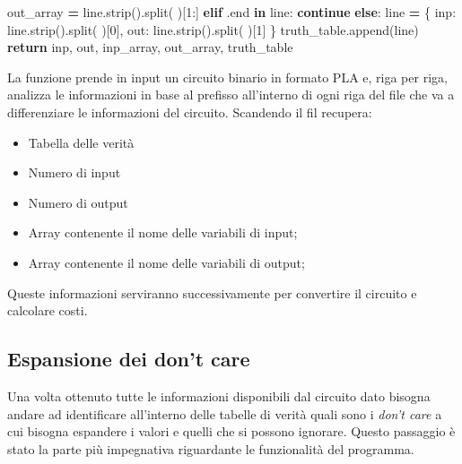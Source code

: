 \documentclass[
  italian,
]{book}
\newenvironment{Shaded}{\begin{snugshade}}{\end{snugshade}}
\newcommand{\ControlFlowTok}[1]{\textcolor[rgb]{0.13,0.29,0.53}{\textbf{#1}}}
\newcommand{\DecValTok}[1]{\textcolor[rgb]{0.00,0.00,0.81}{#1}}
\newcommand{\KeywordTok}[1]{\textcolor[rgb]{0.13,0.29,0.53}{\textbf{#1}}}
\newcommand{\NormalTok}[1]{#1}
\newcommand{\OperatorTok}[1]{\textcolor[rgb]{0.81,0.36,0.00}{\textbf{#1}}}
\newcommand{\StringTok}[1]{\textcolor[rgb]{0.31,0.60,0.02}{#1}}
\providecommand{\tightlist}{%
  \setlength{\itemsep}{0pt}\setlength{\parskip}{0pt}}
\begin{document}
\begin{Shaded}
\begin{Highlighting}[]
\NormalTok{                out\_array }\OperatorTok{=}\NormalTok{ line.strip().split(}\StringTok{\textquotesingle{} \textquotesingle{}}\NormalTok{)[}\DecValTok{1}\NormalTok{:]}
            \ControlFlowTok{elif} \StringTok{\textquotesingle{}.end\textquotesingle{}} \KeywordTok{in}\NormalTok{ line:}
                \ControlFlowTok{continue}
            \ControlFlowTok{else}\NormalTok{:}
\NormalTok{                line }\OperatorTok{=}\NormalTok{ \{}
                    \StringTok{\textquotesingle{}inp\textquotesingle{}}\NormalTok{:  line.strip().split(}\StringTok{\textquotesingle{} \textquotesingle{}}\NormalTok{)[}\DecValTok{0}\NormalTok{],}
                    \StringTok{\textquotesingle{}out\textquotesingle{}}\NormalTok{:  line.strip().split(}\StringTok{\textquotesingle{} \textquotesingle{}}\NormalTok{)[}\DecValTok{1}\NormalTok{]}
\NormalTok{                \}}
\NormalTok{                truth\_table.append(line)}
    \ControlFlowTok{return}\NormalTok{ inp, out, inp\_array, out\_array, truth\_table}
\end{Highlighting}
\end{Shaded}

La funzione prende in input un circuito binario in formato PLA e, riga per riga, analizza le informazioni in base al prefisso all'interno di ogni riga del file che va a differenziare le informazioni del circuito. Scandendo il fil recupera:

\begin{itemize}
\tightlist
\item
  Tabella delle verità
\item
  Numero di input
\item
  Numero di output
\item
  Array contenente il nome delle variabili di input;
\item
  Array contenente il nome delle variabili di output;
\end{itemize}

Queste informazioni serviranno successivamente per convertire il circuito e calcolare costi.

\hypertarget{espansione-dei-dont-care}{%
\subsection{Espansione dei don't care}\label{espansione-dei-dont-care}}

Una volta ottenuto tutte le informazioni disponibili dal circuito dato bisogna andare ad identificare all'interno delle tabelle di verità quali sono i \emph{don't care} a cui bisogna espandere i valori e quelli che si possono ignorare. Questo passaggio è stato la parte più impegnativa riguardante le funzionalità del programma.
\end{document}
